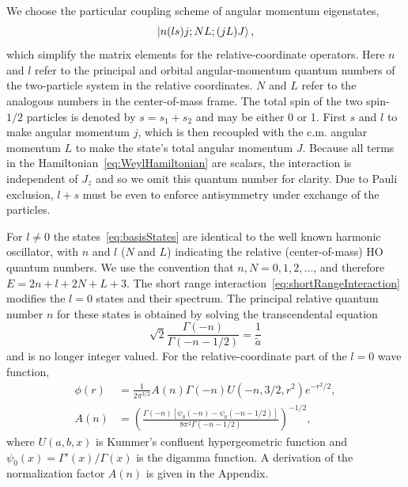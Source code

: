 We choose the particular coupling scheme of angular momentum eigenstates,
\begin{equation}\label{eq:basisStates}
\ket{n(ls)j;NL;(jL)J},
\end{equation}
which simplify the matrix elements for the relative-coordinate operators. Here $n$ and $l$ refer to the principal and orbital angular-momentum quantum numbers of the two-particle system in the relative coordinates. $N$ and $L$ refer to the analogous numbers in the center-of-mass frame. The total spin of the two spin-$1/2$ particles is denoted by $s = s_1 + s_2$ and may be either 0 or 1. First $s$ and $l$ to make angular momentum $j$, which is then recoupled with the c.m. angular momentum $L$ to make the state's total angular momentum $J$. Because all terms in the Hamiltonian~\eqref{eq:WeylHamiltonian} are scalars, the interaction is independent of $J_z$ and so we omit this quantum number for clarity. Due to Pauli exclusion, $l + s$ must be even to enforce antisymmetry under exchange of the particles.

For $l\neq0$ the states~\eqref{eq:basisStates} are identical to the well known harmonic oscillator, with $n$ and $l$ ($N$ and $L$) indicating the relative (center-of-mass) HO quantum numbers. We use the convention that $n,N=0,1,2,\dots$, and therefore $E=2n+l+2N+L+3$. The short range interaction~\eqref{eq:shortRangeInteraction} modifies the $l=0$ states and their spectrum. The principal relative quantum number $n$ for these states is obtained by solving the transcendental equation
\begin{equation}\label{eq:eigenvalueEqn}
\sqrt{2}\frac{\Gamma(-n)}{\Gamma(-n-1/2)}=\frac{1}{\tilde{a}}
\end{equation}
and is no longer integer valued. For the relative-coordinate part of the $l=0$ wave function,
\begin{align}
\phi(r)&=\frac{1}{2\pi^{3/2}}A(n)\Gamma(-n)U(-n,3/2,r^2)e^{-r^2/2}, \label{eq:BuschWF}\\
A(n)&=\left(\frac{\Gamma(-n)[\psi_0(-n)-\psi_0(-n-1/2)]}{8 \pi^2 \Gamma(-n-1/2)}\right)^{-1/2},
\end{align}
where $U(a,b,x)$ is Kummer's confluent hypergeometric function and $\psi_0(x)=\Gamma'(x)/\Gamma(x)$ is the digamma function. A derivation of the normalization factor $A(n)$ is given in the Appendix.


